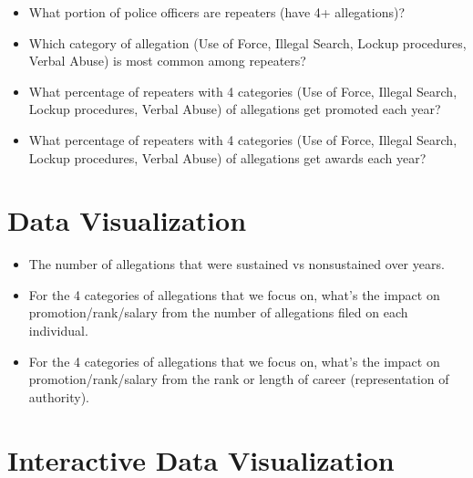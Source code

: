 \documentclass[12pt]{article}
\begin{document}
\begin{itemize}

\item What portion of police officers are repeaters (have 4+ allegations)?

\item Which category of allegation (Use of Force, Illegal Search, Lockup procedures, Verbal Abuse) is most common among repeaters?

\item What percentage of repeaters with 4 categories (Use of Force, Illegal Search, Lockup procedures, Verbal Abuse) of allegations get promoted each year?

\item What percentage of repeaters with 4 categories (Use of Force, Illegal Search, Lockup procedures, Verbal Abuse) of allegations get awards each year?

\end{itemize}



\section{Data Visualization}

\begin{itemize}

\item The number of allegations that were sustained vs nonsustained over years.

\item For the 4 categories of allegations that we focus on, what’s the impact on promotion/rank/salary from the number of allegations filed on each individual.

\item For the 4 categories of allegations that we focus on, what’s the impact on promotion/rank/salary from the rank or length of career (representation of authority).

\end{itemize}



\section{Interactive Data Visualization}
\end{document}
